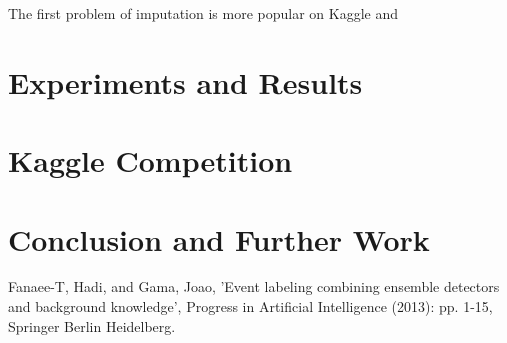 \documentclass[12pt]{article}
\begin{document}
The first problem of imputation is more popular on Kaggle and 

\section{Experiments and Results}
\label{sec:experiments-and-results}

\section{Kaggle Competition}




\section{Conclusion and Further Work}
\label{sec:conclusion}



\begin{thebibliography}{9}
Fanaee-T, Hadi, and Gama, Joao, 'Event labeling combining ensemble detectors and background knowledge', Progress in Artificial Intelligence (2013): pp. 1-15, Springer Berlin Heidelberg.
\end{thebibliography}
\end{document}
